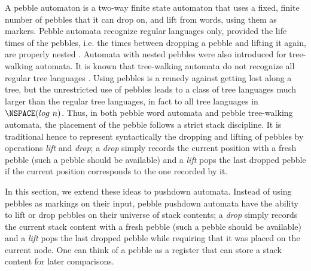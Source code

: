 %
%
% 
%
%
A pebble automaton is a two-way finite state automaton that uses a fixed, finite number of
pebbles that it can drop on, and lift from 
words, using them as markers.
Pebble automata recognize regular languages only, provided the life times of the pebbles, i.e. the times between dropping a pebble and lifting it again, are properly nested
\cite{globerman1996complexity, engelfriet1999tree}.
Automata with nested pebbles were also introduced
for tree-walking automata. 
It is known that tree-walking automata do not recognize all regular tree languages \cite{bojanczyk2008tree}%
.
Using pebbles is a remedy against getting lost along a tree, but 
the unrestricted use of pebbles leads to a class of tree languages much larger than the
regular tree languages, in fact to all tree languages in $\NSPACE(log ~ n)$.
Thus, in  both pebble word automata and pebble tree-walking automata, the placement of the pebble follows a strict stack discipline. It is traditional hence to represent syntactically the dropping and lifting of pebbles by operations \textit{lift} and \textit{drop}; a \textit{drop} simply records the current position with a fresh pebble (such a pebble should be available) %
and a \textit{lift} pops the last dropped pebble if the current position corresponds to the one recorded by it.




In this section, we extend these ideas to pushdown automata. Instead of using pebbles as markings on their input, pebble pushdown automata have the ability to lift or drop pebbles on their universe of stack contents; a \textit{drop} simply records the current stack content with a fresh pebble (such a pebble should be available) %
and a \textit{lift} pops the last dropped pebble 
while requiring that
 it was placed on the current node. 
One can think of a pebble as a register that can store a stack content for later comparisons.



